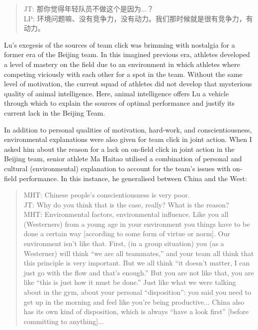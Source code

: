 \begin{CJK}{UTF8}{gbsn}
\begin{quote}
      JT: 那你觉得年轻队员不做这个是因为...？\\
      LP: 环境问题嘛、没有竞争力，没有动力。我们那时候就是很有竞争力，有动力。
\end{quote}

Lu's exegesis of the sources of team click was brimming with nostalgia for a former era of the Beijing team.  In this imagined previous era,  athletes developed a level of mastery on the field due to an environment in which athletes where competing viciously with each other for a spot in the team.  Without the same level of motivation, the current squad of athletes did not develop that mysterious quality of animal intelligence.  Here, animal intelligence offers Lu a vehicle through which to explain the sources of optimal performance and justify its current lack in the Beijing Team.

In addition to personal qualities of motivation, hard-work, and conscientiousness, environmental explanations were also given for team click in joint action.  When I asked him about the reason for a lack on on-field click in joint action in the Beijing team, senior athlete Ma Haitao utilised a combination of personal and cultural (environmental) explanation to account for the team's issues with on-field performance.  In this instance, he generalised between China and the West:

\begin{quote}
  MHT: Chinese people's conscientiousness is very poor.\\
  JT: Why do you think that is the case, really? What is the reason? \\ MHT: Environmental factors, environmental influence.  Like you all (Westerners) from a young age in your environment you things have to be done a certain way [according to some form of virtue or norm].  Our environment isn't like that.  First, (in a group situation) you (as a Westerner) will think ``we are all teammates,'' and your team all think that this principle is very important.  But we all think ``it doesn't matter, I can just go with the flow and that's enough.''  But you are not like that, you are like ``this is just how it must be done.'' Just like what we were talking about in the gym, about your personal ``disposition'': you said you need to get up in the morning and feel like you're being productive... China also has its own kind of disposition, which is always ``have a look first'' [before committing to anything]...
\end{quote}


\end{CJK}
